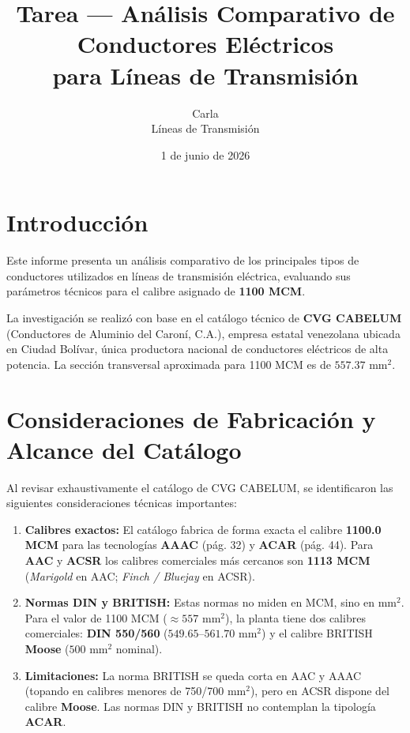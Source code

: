 \documentclass[12pt,a4paper]{article}
\title{Tarea --- Análisis Comparativo de Conductores Eléctricos\\para Líneas de Transmisión}
\author{Carla\\Líneas de Transmisión}
\date{1 de junio de 2026}
\begin{document}
\maketitle

\section{Introducción}

Este informe presenta un análisis comparativo de los principales tipos de
conductores utilizados en líneas de transmisión eléctrica, evaluando sus
parámetros técnicos para el calibre asignado de \textbf{1100 MCM}.

La investigación se realizó con base en el catálogo técnico de \textbf{CVG CABELUM}
(Conductores de Aluminio del Caroní, C.A.), empresa estatal venezolana ubicada
en Ciudad Bolívar, única productora nacional de conductores eléctricos de alta
potencia. La sección transversal aproximada para 1100 MCM es de
$557.37\text{ mm}^2$.

\section{Consideraciones de Fabricación y Alcance del Catálogo}

Al revisar exhaustivamente el catálogo de CVG CABELUM, se identificaron las
siguientes consideraciones técnicas importantes:

\begin{enumerate}
    \item \textbf{Calibres exactos:} El catálogo fabrica de forma exacta el
        calibre \textbf{1100.0 MCM} para las tecnologías \textbf{AAAC} (pág.
        32) y \textbf{ACAR} (pág. 44). Para \textbf{AAC} y \textbf{ACSR} los
        calibres comerciales más cercanos son \textbf{1113 MCM} (\textit{Marigold}
        en AAC; \textit{Finch / Bluejay} en ACSR).

    \item \textbf{Normas DIN y BRITISH:} Estas normas no miden en MCM, sino
        en mm$^2$. Para el valor de 1100 MCM ($\approx 557\text{ mm}^2$), la
        planta tiene dos calibres comerciales: \textbf{DIN 550/560}
        ($549.65\text{--}561.70\text{ mm}^2$) y el calibre BRITISH
        \textbf{Moose} ($500\text{ mm}^2$ nominal).

    \item \textbf{Limitaciones:} La norma BRITISH se queda corta en AAC y AAAC
        (topando en calibres menores de 750/700 mm$^2$), pero en ACSR dispone
        del calibre \textbf{Moose}. Las normas DIN y BRITISH no contemplan la
        tipología \textbf{ACAR}.
\end{enumerate}
\end{document}
